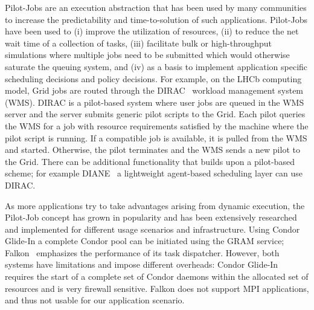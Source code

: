 \documentclass[conference,final]{IEEEtran}
\begin{document}
Pilot-Jobs are an execution abstraction that has been used by many
communities to increase the predictability and time-to-solution of
such applications.  Pilot-Jobs have been used to (i) improve the
utilization of resources, (ii) to reduce the net wait time of a
collection of tasks, (iii) facilitate bulk or high-throughput
simulations where multiple jobs need to be submitted which would
otherwise saturate the queuing system, and (iv) as a basis to
implement application specific scheduling decisions and policy
decisions.  For example, on the LHCb computing model, Grid jobs are
routed through the DIRAC~\cite{dirac} workload management system
(WMS). DIRAC is a pilot-based system where user jobs are queued in the
WMS server and the server submits generic pilot scripts to the
Grid. Each pilot queries the WMS for a job with resource requirements
satisfied by the machine where the pilot script is running. If a
compatible job is available, it is pulled from the WMS and
started. Otherwise, the pilot terminates and the WMS sends a new pilot
to the Grid.  There can be additional functionality that builds upon a
pilot-based scheme; for example DIANE~\cite{diane} a lightweight
agent-based scheduling layer can use DIRAC.


As more applications try to take advantages arising from dynamic
execution, the Pilot-Job concept has grown in popularity and has been
extensively researched and implemented for different usage scenarios
and infrastructure. %
Using Condor Glide-In a complete Condor pool can be initiated using
the GRAM service; Falkon~\cite{1362680} emphasizes the performance of
its task dispatcher. However, both systems have limitations and impose
different overheads: Condor Glide-In~\cite{citeulike:291860} requires
the start of a complete set of Condor daemons within the allocated set
of resources and is very firewall sensitive. Falkon does not 
support MPI applications, and thus not usable for our application scenario.
\end{document}
